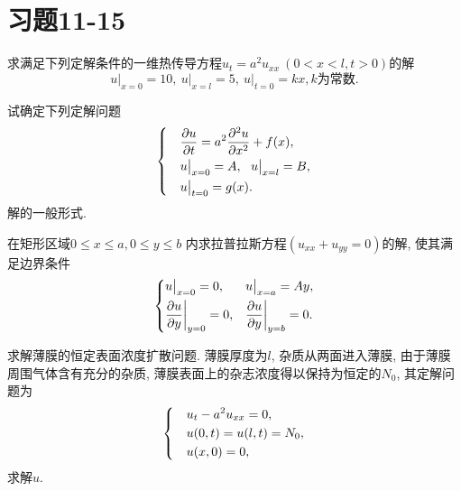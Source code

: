 \section{习题11-15}

\begin{yyEx}
	求满足下列定解条件的一维热传导方程$u_t = a^2u_{xx}~(0<x<l,t>0)$的解
	\begin{equation*}
		u\big\vert_{x = 0} = 10,~u\big\vert_{x = l} = 5,~u\big\vert_{t = 0} = kx, k\text{为常数}.
	\end{equation*}
\end{yyEx}

\begin{yyEx}
	试确定下列定解问题
	\begin{equation*}
	\begin{dcases}
	&\frac{\partial u}{\partial t} = a^2\frac{\partial ^2u}{\partial x^2} + f(x),\\
	&u\big\vert_{x = 0} = A,~~u\big\vert_{x = l} = B,\\
	&u\big\vert_{t = 0} = g(x).
	\end{dcases}
	\end{equation*}
	解的一般形式.
\end{yyEx}

\begin{yyEx}
	在矩形区域$0\leqslant x\leqslant a, 0\leqslant y\leqslant b$ 内求拉普拉斯方程$(u_{xx}+u_{yy} = 0)$的解, 使其满足边界条件
	\begin{equation*}
		\begin{dcases}
			u\big\vert_{x = 0} = 0, &u\big\vert_{x = a} = Ay,\\
			\frac{\partial u}{\partial y}\bigg\vert_{y = 0} = 0, &\frac{\partial u}{\partial y}\bigg\vert_{y = b} = 0.
		\end{dcases}
	\end{equation*}
\end{yyEx}

\begin{yyEx}
	求解薄膜的恒定表面浓度扩散问题. 薄膜厚度为$l$, 杂质从两面进入薄膜, 由于薄膜周围气体含有充分的杂质, 薄膜表面上的杂志浓度得以保持为恒定的$N_0$, 其定解问题为
	\begin{equation*}
		\begin{dcases}
			&u_t-a^2u_{xx} = 0,\\
			&u(0,t) = u(l,t) = N_0,\\
			&u(x,0) = 0,
		\end{dcases}
	\end{equation*}
	求解$u$.
\end{yyEx}

